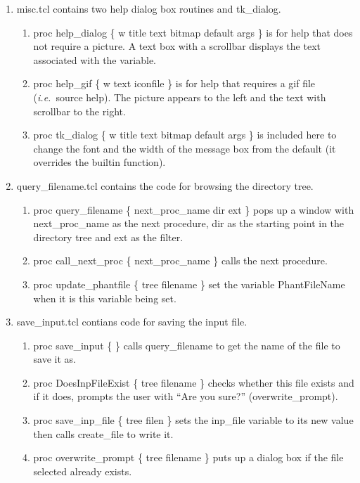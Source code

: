 \documentclass[12pt]{book}
\newcommand{\ie}{{\em i.e.}}
\begin{document}
\begin{enumerate}
\item misc.tcl contains two help dialog box routines and tk\_dialog.
\begin{enumerate}
\item proc help\_dialog \{ w title text bitmap default args \} is for
help that does not require a picture.  A text box with a scrollbar
displays the text associated with the variable.
\item proc help\_gif \{ w text iconfile \} is for help that requires a
gif file (\ie~source help).  The picture appears to the left and the
text with scrollbar to the right.
\item proc tk\_dialog \{ w title text bitmap default args \} is included
here to change the font and the width of the message box from the
default (it overrides the builtin function).
\end{enumerate}

\item query\_filename.tcl contains the code for browsing the directory tree.
\begin{enumerate}
\item proc query\_filename \{ next\_proc\_name dir ext \} pops up a
window with next\_proc\_name as the next procedure, dir as the starting
point in the directory tree and ext as the filter.
\item proc call\_next\_proc \{ next\_proc\_name \} calls the next
procedure.
\item proc update\_phantfile \{ tree filename \} set the variable
PhantFileName when it is this variable being set.
\end{enumerate}

\item save\_input.tcl contians code for saving the input file.
\begin{enumerate}
\item proc save\_input \{ \} calls query\_filename to get the name of
the file to save it as.
\item proc DoesInpFileExist \{ tree filename \} checks whether this file
exists and if it does, prompts the user with ``Are you sure?''
(overwrite\_prompt).
\item proc save\_inp\_file \{ tree filen \} sets the inp\_file variable
to its new value then calls create\_file to write it.
\item proc overwrite\_prompt \{ tree filename \} puts up a dialog box if
the file selected already exists.
\end{enumerate}


\end{enumerate}
\end{document}
